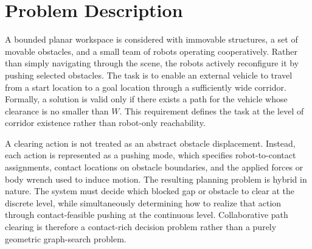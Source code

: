 \section{Problem Description}
\label{sec:problem}

A bounded planar workspace is considered with immovable structures, a set of
movable obstacles, and a small team of robots operating cooperatively. Rather
than simply navigating through the scene, the robots actively reconfigure it by
pushing selected obstacles. The task is to enable an external vehicle to travel
from a start location to a goal location through a sufficiently wide corridor.
Formally, a solution is valid only if there exists a path for the vehicle whose
clearance is no smaller than $W$. This requirement defines the task at the
level of corridor existence rather than robot-only reachability.

A clearing action is not treated as an abstract obstacle displacement. Instead,
each action is represented as a pushing mode, which specifies robot-to-contact
assignments, contact locations on obstacle boundaries, and the applied forces
or body wrench used to induce motion. The resulting planning problem is hybrid
in nature. The system must decide which blocked gap or obstacle to clear at the
discrete level, while simultaneously determining how to realize that action
through contact-feasible pushing at the continuous level. Collaborative path
clearing is therefore a contact-rich decision problem rather than a purely
geometric graph-search problem.
